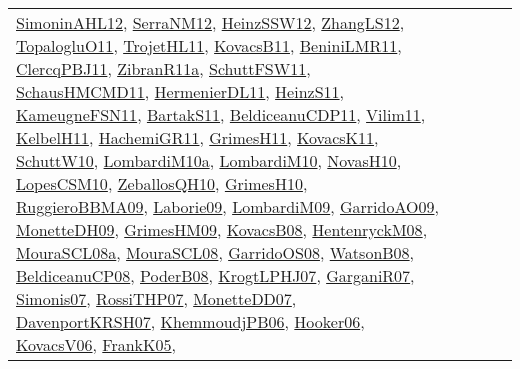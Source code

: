 {\begin{longtable}{lp{3cm}>{\raggedright}p{6cm}>{\raggedright}p{6cm}p{8cm}}
\href{papers/SimoninAHL12.pdf}{SimoninAHL12}\cite{SimoninAHL12}, \href{papers/SerraNM12.pdf}{SerraNM12}\cite{SerraNM12}, \href{articles/HeinzSSW12.pdf}{HeinzSSW12}\cite{HeinzSSW12}, \href{papers/ZhangLS12.pdf}{ZhangLS12}\cite{ZhangLS12}, \href{articles/TopalogluO11.pdf}{TopalogluO11}\cite{TopalogluO11}, \href{articles/TrojetHL11.pdf}{TrojetHL11}\cite{TrojetHL11}, \href{articles/KovacsB11.pdf}{KovacsB11}\cite{KovacsB11}, \href{articles/BeniniLMR11.pdf}{BeniniLMR11}\cite{BeniniLMR11}, \href{papers/ClercqPBJ11.pdf}{ClercqPBJ11}\cite{ClercqPBJ11}, \href{papers/ZibranR11a.pdf}{ZibranR11a}\cite{ZibranR11a}, \href{articles/SchuttFSW11.pdf}{SchuttFSW11}\cite{SchuttFSW11}, \href{articles/SchausHMCMD11.pdf}{SchausHMCMD11}\cite{SchausHMCMD11}, \href{papers/HermenierDL11.pdf}{HermenierDL11}\cite{HermenierDL11}, \href{papers/HeinzS11.pdf}{HeinzS11}\cite{HeinzS11}, \href{papers/KameugneFSN11.pdf}{KameugneFSN11}\cite{KameugneFSN11}, \href{articles/BartakS11.pdf}{BartakS11}\cite{BartakS11}, \href{articles/BeldiceanuCDP11.pdf}{BeldiceanuCDP11}\cite{BeldiceanuCDP11}, \href{papers/Vilim11.pdf}{Vilim11}\cite{Vilim11}, \href{articles/KelbelH11.pdf}{KelbelH11}\cite{KelbelH11}, \href{articles/HachemiGR11.pdf}{HachemiGR11}\cite{HachemiGR11}, \href{papers/GrimesH11.pdf}{GrimesH11}\cite{GrimesH11}, \href{articles/KovacsK11.pdf}{KovacsK11}\cite{KovacsK11}, \href{papers/SchuttW10.pdf}{SchuttW10}\cite{SchuttW10}, \href{articles/LombardiM10a.pdf}{LombardiM10a}\cite{LombardiM10a}, \href{papers/LombardiM10.pdf}{LombardiM10}\cite{LombardiM10}, \href{articles/NovasH10.pdf}{NovasH10}\cite{NovasH10}, \href{articles/LopesCSM10.pdf}{LopesCSM10}\cite{LopesCSM10}, \href{articles/ZeballosQH10.pdf}{ZeballosQH10}\cite{ZeballosQH10}, \href{papers/GrimesH10.pdf}{GrimesH10}\cite{GrimesH10}, \href{articles/RuggieroBBMA09.pdf}{RuggieroBBMA09}\cite{RuggieroBBMA09}, \href{papers/Laborie09.pdf}{Laborie09}\cite{Laborie09}, \href{papers/LombardiM09.pdf}{LombardiM09}\cite{LombardiM09}, \href{articles/GarridoAO09.pdf}{GarridoAO09}\cite{GarridoAO09}, \href{papers/MonetteDH09.pdf}{MonetteDH09}\cite{MonetteDH09}, \href{papers/GrimesHM09.pdf}{GrimesHM09}\cite{GrimesHM09}, \href{articles/KovacsB08.pdf}{KovacsB08}\cite{KovacsB08}, \href{papers/HentenryckM08.pdf}{HentenryckM08}\cite{HentenryckM08}, \href{papers/MouraSCL08a.pdf}{MouraSCL08a}\cite{MouraSCL08a}, \href{papers/MouraSCL08.pdf}{MouraSCL08}\cite{MouraSCL08}, \href{articles/GarridoOS08.pdf}{GarridoOS08}\cite{GarridoOS08}, \href{papers/WatsonB08.pdf}{WatsonB08}\cite{WatsonB08}, \href{papers/BeldiceanuCP08.pdf}{BeldiceanuCP08}\cite{BeldiceanuCP08}, \href{papers/PoderB08.pdf}{PoderB08}\cite{PoderB08}, \href{papers/KrogtLPHJ07.pdf}{KrogtLPHJ07}\cite{KrogtLPHJ07}, \href{papers/GarganiR07.pdf}{GarganiR07}\cite{GarganiR07}, \href{articles/Simonis07.pdf}{Simonis07}\cite{Simonis07}, \href{papers/RossiTHP07.pdf}{RossiTHP07}\cite{RossiTHP07}, \href{papers/MonetteDD07.pdf}{MonetteDD07}\cite{MonetteDD07}, \href{papers/DavenportKRSH07.pdf}{DavenportKRSH07}\cite{DavenportKRSH07}, \href{papers/KhemmoudjPB06.pdf}{KhemmoudjPB06}\cite{KhemmoudjPB06}, \href{articles/Hooker06.pdf}{Hooker06}\cite{Hooker06}, \href{papers/KovacsV06.pdf}{KovacsV06}\cite{KovacsV06}, \href{papers/FrankK05.pdf}{FrankK05}\cite{FrankK05}, 
\end{longtable}}
